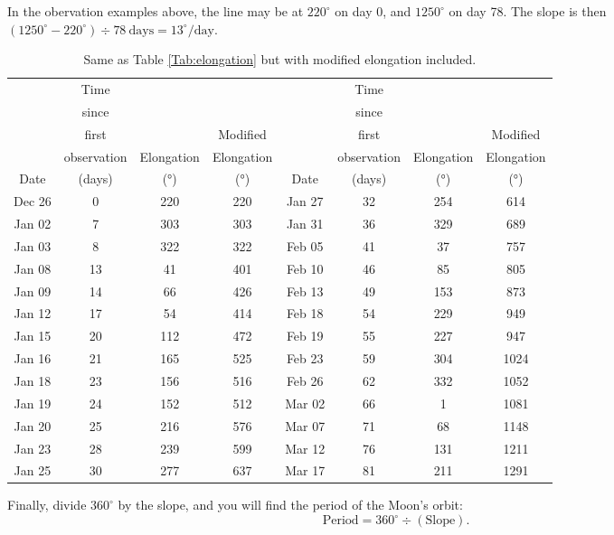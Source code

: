 \documentclass{exam}
\newcommand{\BE}{\begin{equation}}
\newcommand{\EE}{\end{equation}}
\begin{document}
In the obervation examples above, the line may be at $220^\circ$ on day 0, and $1250^\circ$ on day 78. The slope is then $(1250^\circ - 220^\circ) \div 78~\mathrm{days} = 13^\circ / \mathrm{day}$.\\
\begin{table}[!h]
\centering
\begin{tabular}{|c|c|c|c||c|c|c|c|}
\hline
 		& Time 			&   			&   			&  		& Time 			&   			& 				\\
 		& since 		&   			&   			&  		& since 		&   			& 				\\
 		& first  		&   			& Modified		&		& first  		&   			& Modified		\\
 		& observation  	& Elongation  	& Elongation	&		& observation  	& Elongation  	& Elongation	\\
Date 	& (days) 		& (°)  			& (°) 			& Date 	& (days) 		& (°)  			& (°)			\\
\hline
Dec 26 & 0 & 220 & 220 & Jan 27 & 32 & 254 & 614\\
Jan 02 & 7 & 303 & 303 & Jan 31 & 36 & 329 & 689\\
Jan 03 & 8 & 322 & 322 & Feb 05 & 41 & 37 & 757\\
Jan 08 & 13 & 41 & 401 & Feb 10 & 46 & 85 & 805\\
Jan 09 & 14 & 66 & 426 & Feb 13 & 49 & 153 & 873\\
Jan 12 & 17 & 54 & 414 & Feb 18 & 54 & 229 & 949\\
Jan 15 & 20 & 112 & 472 & Feb 19 & 55 & 227 & 947\\
Jan 16 & 21 & 165 & 525 & Feb 23 & 59 & 304 & 1024\\
Jan 18 & 23 & 156 & 516 & Feb 26 & 62 & 332 & 1052\\
Jan 19 & 24 & 152 & 512 & Mar 02 & 66 & 1 & 1081\\
Jan 20 & 25 & 216 & 576 & Mar 07 & 71 & 68 & 1148\\
Jan 23 & 28 & 239 & 599 & Mar 12 & 76 & 131 & 1211\\
Jan 25 & 30 & 277 & 637 & Mar 17 & 81 & 211 & 1291\\
\hline
\end{tabular}
\caption{\label{Tab:mod_elongation}Same as Table \ref{Tab:elongation} but with modified elongation included.}
\end{table}


Finally, divide $360^\circ$ by the slope, and you will find the period of the Moon's orbit:
\BE \mathrm{Period} = 360^\circ \div (\mathrm{Slope}). \EE
\end{document}
